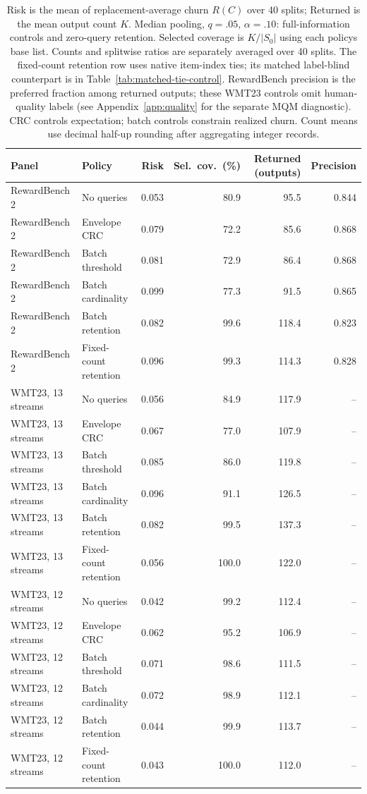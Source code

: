 \begin{table}[t]
\centering\small
\begin{tabular}{llrrrr}
\toprule
Panel & Policy & Risk & Sel.\ cov.\ (\%) & Returned (outputs) & Precision \\
\midrule
RewardBench 2 & No queries & 0.053 & 80.9 & 95.5 & 0.844 \\
RewardBench 2 & Envelope CRC & 0.079 & 72.2 & 85.6 & 0.868 \\
RewardBench 2 & Batch threshold & 0.081 & 72.9 & 86.4 & 0.868 \\
RewardBench 2 & Batch cardinality & 0.099 & 77.3 & 91.5 & 0.865 \\
RewardBench 2 & Batch retention & 0.082 & 99.6 & 118.4 & 0.823 \\
RewardBench 2 & Fixed-count retention & 0.096 & 99.3 & 114.3 & 0.828 \\
WMT23, 13 streams & No queries & 0.056 & 84.9 & 117.9 & -- \\
WMT23, 13 streams & Envelope CRC & 0.067 & 77.0 & 107.9 & -- \\
WMT23, 13 streams & Batch threshold & 0.085 & 86.0 & 119.8 & -- \\
WMT23, 13 streams & Batch cardinality & 0.096 & 91.1 & 126.5 & -- \\
WMT23, 13 streams & Batch retention & 0.082 & 99.5 & 137.3 & -- \\
WMT23, 13 streams & Fixed-count retention & 0.056 & 100.0 & 122.0 & -- \\
WMT23, 12 streams & No queries & 0.042 & 99.2 & 112.4 & -- \\
WMT23, 12 streams & Envelope CRC & 0.062 & 95.2 & 106.9 & -- \\
WMT23, 12 streams & Batch threshold & 0.071 & 98.6 & 111.5 & -- \\
WMT23, 12 streams & Batch cardinality & 0.072 & 98.9 & 112.1 & -- \\
WMT23, 12 streams & Batch retention & 0.044 & 99.9 & 113.7 & -- \\
WMT23, 12 streams & Fixed-count retention & 0.043 & 100.0 & 112.0 & -- \\
\bottomrule
\end{tabular}
\caption{Risk is the mean of replacement-average churn $R(C)$ over 40 splits; Returned is the mean output count $K$. Median pooling, $q=.05$, $\alpha=.10$: full-information controls and zero-query retention. Selected coverage is $K/|S_0|$ using each policy\textquotesingle s base list. Counts and splitwise ratios are separately averaged over 40 splits. The fixed-count retention row uses native item-index ties; its matched label-blind counterpart is in Table~\ref{tab:matched-tie-control}. RewardBench precision is the preferred fraction among returned outputs; these WMT23 controls omit human-quality labels (see Appendix~\ref{app:quality} for the separate MQM diagnostic). CRC controls expectation; batch controls constrain realized churn. Count means use decimal half-up rounding after aggregating integer records.}
\label{tab:baselines}
\end{table}
